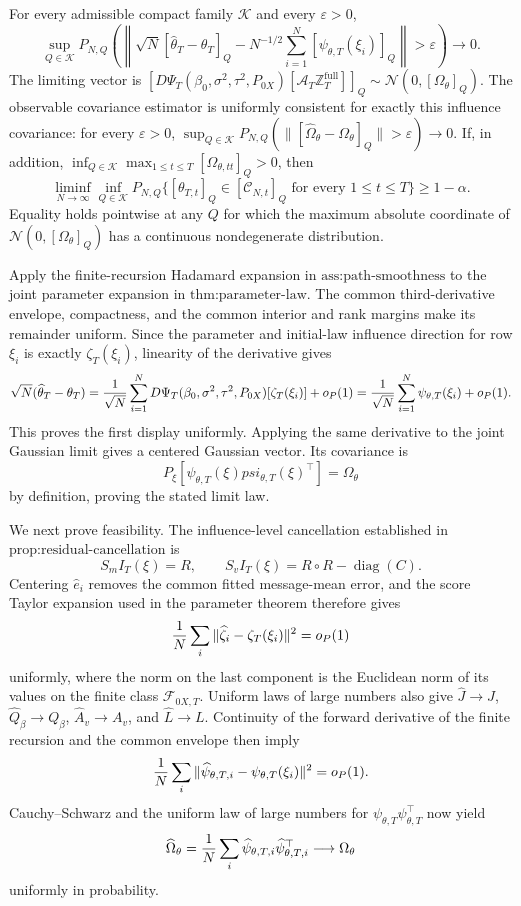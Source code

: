 For every admissible compact family \(\mathcal K\) and every \(\varepsilon>0\),
\[
 \sup_{Q\in\mathcal K}P_{N,Q}\!\left(\left\|\sqrt N[\widehat\theta_T-\theta_T]_Q-N^{-1/2}\sum_{i=1}^N[\psi_{\theta,T}(\xi_i)]_Q\right\|>\varepsilon\right)\to0.
\]
The limiting vector is \([D\Psi_T(\beta_0,\sigma^2,\tau^2,P_{0X})[\mathcal A_T\mathbb Z_T^{\mathrm{full}}]]_Q\sim\mathcal N(0,[\Omega_\theta]_Q)\).  The observable covariance estimator is uniformly consistent for exactly this influence covariance: for every \(\varepsilon>0\), \(\sup_{Q\in\mathcal K}P_{N,Q}(\|[\widehat\Omega_\theta-\Omega_\theta]_Q\|>\varepsilon)\to0\).  If, in addition, \(\inf_{Q\in\mathcal K}\max_{1\le t\le T}[\Omega_{\theta,tt}]_Q>0\), then
\[
 \liminf_{N\to\infty}\inf_{Q\in\mathcal K}P_{N,Q}\{[\theta_{T,t}]_Q\in[\mathcal C_{N,t}]_Q\text{ for every }1\le t\le T\}\ge1-\alpha.
\]
Equality holds pointwise at any \(Q\) for which the maximum absolute coordinate of \(\mathcal N(0,[\Omega_\theta]_Q)\) has a continuous nondegenerate distribution.

Apply the finite-recursion Hadamard expansion in \(\text{ass:path-smoothness}\) to the joint parameter expansion in \(\text{thm:parameter-law}\).  The common third-derivative envelope, compactness, and the common interior and rank margins make its remainder uniform.  Since the parameter and initial-law influence direction for row \(\xi_i\) is exactly \(\zeta_T(\xi_i)\), linearity of the derivative gives
\[
 \sqrt N(\widehat\theta_T-\theta_T)
 ={1\over\sqrt N}\sum_{i=1}^ND\Psi_T(\beta_0,\sigma^2,\tau^2,P_{0X})[\zeta_T(\xi_i)]+o_P(1)
 ={1\over\sqrt N}\sum_{i=1}^N\psi_{\theta,T}(\xi_i)+o_P(1).
\]
This proves the first display uniformly.  Applying the same derivative to the joint Gaussian limit gives a centered Gaussian vector.  Its covariance is
\[
 P_\xi[\psi_{\theta,T}(\xi)psi_{\theta,T}(\xi)^{\top}]=\Omega_\theta
\]
by definition, proving the stated limit law.

We next prove feasibility.  The influence-level cancellation established in \(\text{prop:residual-cancellation}\) is
\[
 S_mI_T(\xi)=R,
 \qquad S_vI_T(\xi)=R\circ R-\operatorname{diag}(C).
\]
Centering \(\widehat e_i\) removes the common fitted message-mean error, and the score Taylor expansion used in the parameter theorem therefore gives
\[
 {1\over N}\sum_i\|\widehat\zeta_i-\zeta_T(\xi_i)\|^2=o_P(1)
\]
uniformly, where the norm on the last component is the Euclidean norm of its values on the finite class \(\mathcal F_{0X,T}\).  Uniform laws of large numbers also give \(\widehat J\to J\), \(\widehat Q_\beta\to Q_\beta\), \(\widehat A_v\to A_v\), and \(\widehat L\to L\).  Continuity of the forward derivative of the finite recursion and the common envelope then imply
\[
 {1\over N}\sum_i\|\widehat\psi_{\theta,T,i}-\psi_{\theta,T}(\xi_i)\|^2=o_P(1).
\]
Cauchy--Schwarz and the uniform law of large numbers for \(\psi_{\theta,T}\psi_{\theta,T}^{\top}\) now yield
\[
 \widehat\Omega_\theta={1\over N}\sum_i\widehat\psi_{\theta,T,i}\widehat\psi_{\theta,T,i}^{\top}
 \longrightarrow\Omega_\theta
\]
uniformly in probability.

